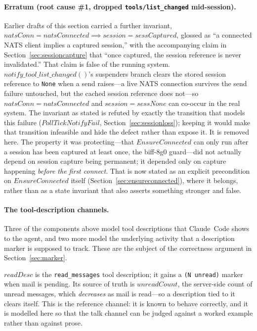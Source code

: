 \documentclass[a4paper,10pt,fleqn]{article}
\begin{document}
\paragraph{Erratum (root cause \#1, dropped \texttt{tools/list\_changed}
mid-session).}  Earlier drafts of this section carried a further
invariant, $natsConn = natsConnected \implies session = sessCaptured$,
glossed as ``a connected NATS client implies a captured session,'' with
the accompanying claim in Section~\ref{sec:sessioncapture} that ``once
captured, the session reference is never invalidated.''  That claim is
false of the running system.  $notify\_tool\_list\_changed()$'s
suspenders branch clears the stored session reference to \texttt{None}
when a send raises---a live NATS connection survives the send failure
untouched, but the cached session reference does not---so
$natsConn = natsConnected$ and $session = sessNone$ can co-occur in the
real system.  The invariant as stated is refuted by exactly the
transition that models this failure ($PollTickNotifyFail$,
Section~\ref{sec:sessionloss}); keeping it would make that transition
infeasible and hide the defect rather than expose it.  It is removed
here.  The property it was protecting---that $EnsureConnected$ can only
run after a session has been captured at least once, the biff-8g0
guard---did not actually depend on session capture being permanent; it
depended only on capture happening \emph{before the first connect}.
That is now stated as an explicit precondition on $EnsureConnected$
itself (Section~\ref{sec:ensureconnected}), where it belongs, rather
than as a state invariant that also asserts something stronger and
false.

\paragraph{The tool-description channels.}  Three of the components above
model tool descriptions that Claude~Code shows to the agent, and two more
model the underlying activity that a description marker is supposed to
track.  These are the subject of the correctness argument in
Section~\ref{sec:marker}.

$readDesc$ is the \texttt{read\_messages} tool description; it gains a
\texttt{(N unread)} marker when mail is pending.  Its source of truth is
$unreadCount$, the server-side count of unread messages, which
\emph{decreases} as mail is read---so a description tied to it clears
itself.  This is the reference channel: it is known to behave correctly,
and it is modelled here so that the talk channel can be judged against a
worked example rather than against prose.
\end{document}
